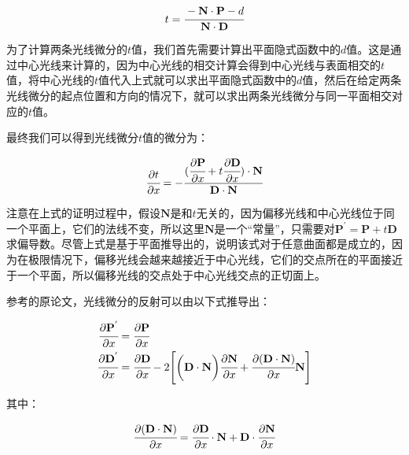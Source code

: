 \begin{equation}
	t= \cfrac{-\mathbf{N}\cdot \mathbf{P}-d}{\mathbf{N}\cdot\mathbf{D}}
\end{equation}

为了计算两条光线微分的$t$值，我们首先需要计算出平面隐式函数中的$d$值。这是通过中心光线来计算的，因为中心光线的相交计算会得到中心光线与表面相交的$t$值，将中心光线的$t$值代入上式就可以求出平面隐式函数中的$d$值，然后在给定两条光线微分的起点位置和方向的情况下，就可以求出两条光线微分与同一平面相交对应的$t$值。

最终我们可以得到光线微分$t$值的微分为：

\begin{equation}
	 \cfrac{{\rm \partial} t}{{\rm \partial} x}=- \cfrac{( \cfrac{{\rm \partial}\mathbf{P}}{{\rm \partial} x} +t \cfrac{{\rm \partial}\mathbf{D}}{{\rm \partial} x})\cdot\mathbf{N}}{\mathbf{D}\cdot\mathbf{N}}
\end{equation}

注意在上式的证明过程中，假设$\mathbf{N}$是和$t$无关的，因为偏移光线和中心光线位于同一个平面上，它们的法线不变，所以这里$\mathbf{N}$是一个“常量”，只需要对$\mathbf{P}^{'}=\mathbf{P}+t\mathbf{D}$求偏导数。尽管上式是基于平面推导出的，\cite{a:TracingRayDifferentials}说明该式对于任意曲面都是成立的，因为在极限情况下，偏移光线会越来越接近于中心光线，它们的交点所在的平面接近于一个平面，所以偏移光线的交点处于中心光线交点的正切面上。

参考\cite{a:TracingRayDifferentials}的原论文，光线微分的反射可以由以下式推导出：

\begin{equation}
	\begin{aligned}
		 \cfrac{{\rm \partial}\mathbf{P}^{'}}{{\rm \partial} x}&= \cfrac{{\rm \partial}\mathbf{P}}{{\rm \partial} x}\\
		 \cfrac{{\rm \partial}\mathbf{D}^{'}}{{\rm \partial} x}&= \cfrac{{\rm \partial}\mathbf{D}}{{\rm \partial} x}-2\Bigg[\bigg(\mathbf{D}\cdot\mathbf{N}\bigg) \cfrac{{\rm \partial}\mathbf{N}}{{\rm \partial} x}+ \cfrac{{\rm \partial} (\mathbf{D}\cdot\mathbf{N})}{{\rm \partial} x}\mathbf{N}\Bigg]
	\end{aligned}
\end{equation}

\noindent 其中：

\begin{equation}
	 \cfrac{{\rm \partial} (\mathbf{D}\cdot\mathbf{N})}{{\rm \partial} x}= \cfrac{{\rm \partial}\mathbf{D}}{{\rm \partial} x}\cdot\mathbf{N}+\mathbf{D}\cdot \cfrac{{\rm \partial}\mathbf{N}}{{\rm \partial} x}
\end{equation}

